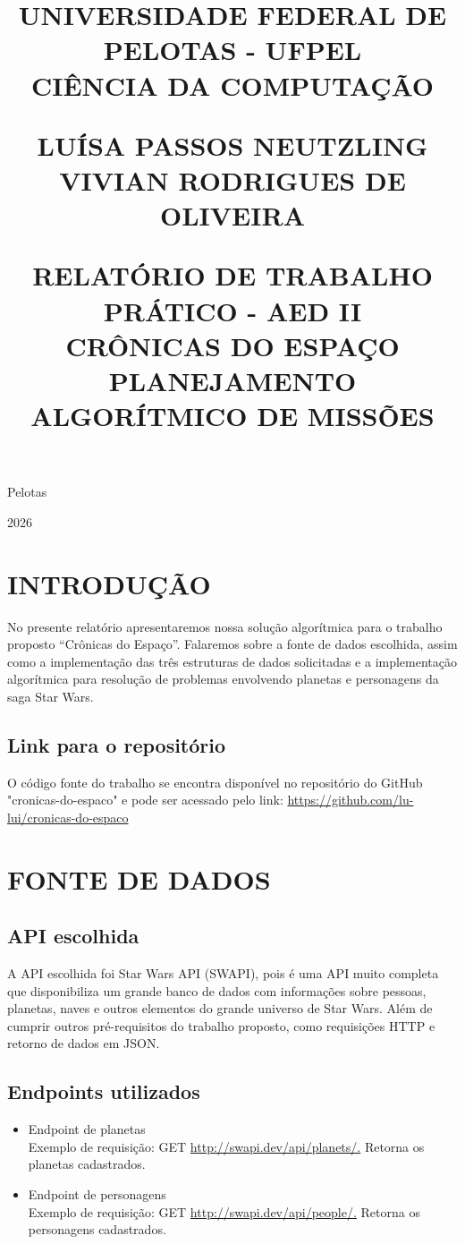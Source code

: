 \documentclass[12pt,a4paper]{article}
\title{
    {\small
    UNIVERSIDADE FEDERAL DE PELOTAS - UFPEL \\
    CIÊNCIA DA COMPUTAÇÃO
    }

    \vspace{1.5cm}
    {\small
    LUÍSA PASSOS NEUTZLING \\
    VIVIAN RODRIGUES DE OLIVEIRA
    }
 
    \vspace{5cm}
    {\Huge\textbf{RELATÓRIO DE TRABALHO PRÁTICO - AED II}} \\
    {\Large{CRÔNICAS DO ESPAÇO}} \\
    {\Large{PLANEJAMENTO ALGORÍTMICO DE MISSÕES}}
}
\date{}
\begin{document}
 \maketitle \thispagestyle{empty} \vfill 
\begin{center} Pelotas \end{center} 
\begin{center} 2026 \end{center} 
\newpage

\tableofcontents
\newpage

\section{INTRODUÇÃO}

No presente relatório apresentaremos nossa solução algorítmica para o trabalho proposto “Crônicas do Espaço”. Falaremos sobre a fonte de dados escolhida, assim como a implementação das três estruturas de dados solicitadas e a implementação algorítmica para resolução de problemas envolvendo planetas e personagens da saga Star Wars.

\subsection{Link para o repositório}
O código fonte do trabalho se encontra disponível no repositório do GitHub "cronicas-do-espaco" e pode ser acessado pelo link: \url{https://github.com/lu-lui/cronicas-do-espaco} 

\section{FONTE DE DADOS}

\subsection{API escolhida}
A API escolhida foi Star Wars API (SWAPI), pois é uma API muito completa que disponibiliza um grande banco de dados com informações sobre pessoas, planetas, naves e outros elementos do grande universo de Star Wars. Além de cumprir outros pré-requisitos do trabalho proposto, como requisições HTTP e retorno de dados em JSON.

\subsection{Endpoints utilizados}
\begin{itemize}
    \item Endpoint de planetas \\
    Exemplo de requisição: GET \url{http://swapi.dev/api/planets/.} Retorna os planetas cadastrados.
    \item Endpoint de personagens \\
    Exemplo de requisição: GET \url{http://swapi.dev/api/people/.} Retorna os personagens cadastrados. 
\end{itemize}
\end{document}
